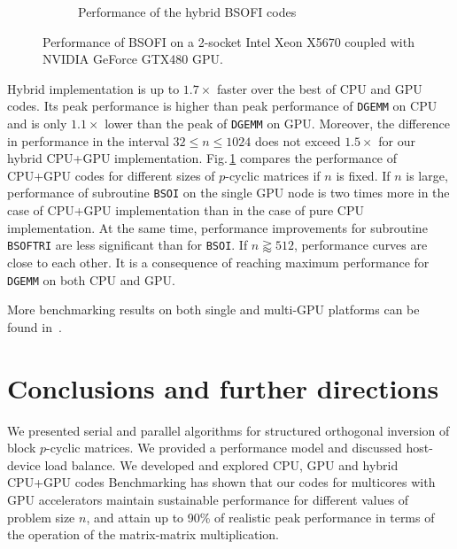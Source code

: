 \documentclass{llncs}
\newcommand{\Bsoftri}{\texttt{BSOFTRI}\xspace}
\newcommand{\Bsoi}{\texttt{BSOI}\xspace}
\newcommand{\Gemm}{\texttt{DGEMM}\xspace}
\begin{document}
\begin{figure}[t]
\begin{subfigure}[t]{0.49\linewidth}
    \caption{Performance of the hybrid BSOFI codes\label{fig:perf_hybrid_BSOFTRI_BSOI}}
  \end{subfigure}
  \caption{Performance of BSOFI on 
    a 2-socket Intel Xeon X5670 coupled with NVIDIA GeForce GTX480 GPU.} 
  \label{fig:performance_BSO}
\end{figure}
%
Hybrid implementation is up to $1.7\times$ faster over the 
best of CPU and GPU codes.
Its peak performance is higher than peak 
performance of \Gemm on CPU 
and is only $1.1\times$ lower than the peak of \Gemm on GPU.
Moreover, 
the difference in performance in the interval $32 \leq n \leq 1024$ 
does not exceed $1.5\times$ for our hybrid CPU+GPU implementation. %
%
Fig.\,\ref{fig:perf_hybrid_BSOFTRI_BSOI} %
compares 
the performance of CPU+GPU codes for different sizes of $p$-cyclic matrices if $n$ is fixed. 
If $n$ is large, performance of subroutine \Bsoi on the single GPU node 
is two times more in the case of CPU+GPU implementation  
than in the case of pure CPU implementation.
At the same time, 
performance improvements for subroutine \Bsoftri 
are less significant than for \Bsoi.
If $n \gtrapprox 512$, performance curves are close to each other. 
It is a consequence of reaching maximum performance for {\tt DGEMM}
on both CPU and GPU. 

More benchmarking results on both single and multi-GPU platforms 
can be found in~\cite{GogolenkoBai13}.

\section{Conclusions and further directions}
\label{sec:conclusions}

We presented serial and parallel algorithms for structured orthogonal inversion
of block $p$-cyclic matrices. %
We provided a performance model and discussed host-device load balance.
We developed and explored CPU, GPU and hybrid CPU+GPU codes
Benchmarking has shown that 
our codes for multicores with GPU accelerators
maintain sustainable performance for different values 
of problem size $n$, and attain up to 90\% of realistic peak performance in 
terms of the operation of the matrix-matrix multiplication. 
\end{document}
